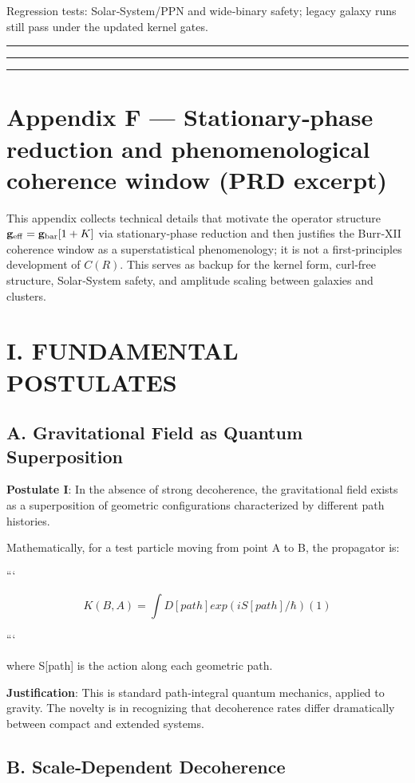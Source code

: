 \documentclass[11pt,a4paper]{article}
\begin{document}
Regression tests: Solar‑System/PPN and wide‑binary safety; legacy galaxy runs still pass under the updated kernel gates.


\medskip\hrule\medskip


\medskip\hrule\medskip


\medskip\hrule\medskip


\section{Appendix F — Stationary‑phase reduction and phenomenological coherence window (PRD excerpt)}


This appendix collects technical details that motivate the operator structure $\mathbf{g}_{\rm eff}=\mathbf{g}_{\rm bar}[1+K]$ via stationary‑phase reduction and then justifies the Burr‑XII coherence window as a superstatistical phenomenology; it is not a first‑principles development of $C(R)$. This serves as backup for the kernel form, curl‑free structure, Solar‑System safety, and amplitude scaling between galaxies and clusters.


\section{I. FUNDAMENTAL POSTULATES}


\subsection{A. Gravitational Field as Quantum Superposition}


\textbf{Postulate I}: In the absence of strong decoherence, the gravitational field exists as a superposition of geometric configurations characterized by different path histories.


Mathematically, for a test particle moving from point A to B, the propagator is:


```

\[
K(B,A) = ∫ D[path] exp(iS[path]/ℏ)     (1)
\]

```


where S[path] is the action along each geometric path.


\textbf{Justification}: This is standard path‑integral quantum mechanics, applied to gravity. The novelty is in recognizing that decoherence rates differ dramatically between compact and extended systems.


\subsection{B. Scale‑Dependent Decoherence}
\end{document}
